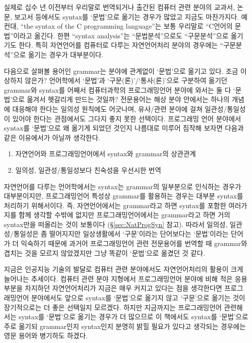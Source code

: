 실제로 십수 년 이전부터 우리말로 번역되거나 출간된 컴퓨터 관련 분야의
교과서, 논문, 보고서 등에서도 syntax를 `문법'으로 옮기는 경우가 많았고
지금도 마찬가지다. 예컨대, ``the syntax of the C programming language''는
보통 우리말로 ``C언어의 문법''이라고 옮긴다. 한편 ``syntax analysis''는
``문법분석''으로도 ``구문분석''으로 옮기기도 한다. 특히 자연언어를 컴퓨터로
다루는 자연언어처리 분야의 경우에는 ``구문분석''으로 옮기는 경우가 대부분이다.

다음으로 살펴볼 용어인 grammar는 분야에 관계없이 `문법'으로 옮기고 있다.
조금 이상하지 않은가? 언어학에서 `문법'과 `구문(론)'/`통사(론)'으로 구분하여
옮기던 grammar와 syntax를 어째서 컴퓨터과학의 프로그래밍언어 분야에 와서는
둘 다 `문법'으로 옮겨서 헷갈리게 만드는 것일까? 전문용어는 해상 분야 안에서는
하나의 개념에 대응해야 한다는 일의성 원칙에도 어긋나며, 유사/관련 분야에 걸쳐
일관성/통일성이 있어야 한다는 관점에서도 그다지 좋지 못한 선택이다.
프로그래밍 언어 분야에서 syntax를 `문법'으로 왜 옮기게 되었던 것인지
나름대로 미루어 짐작해 보자면 다음과 같은 이유에서가 아닐까 생각한다.
\begin{enumerate}\tightlist
    \item 자연언어와 프로그래밍언어에서 syntax와 grammar의 상관관계
    \item 일의성, 일관성/통일성보다 친숙성을 우선시한 번역
\end{enumerate}

자연언어를 다루는 언어학에서는 syntax는 grammar의 일부분으로 인식하는 경우가
대부분이지만, 프로그래밍언어 특성상 grammar를 활용하는 경우는 대부분
syntax를 처리하기 위해서이다. 즉, 자연언어에서는 grammar라고 하면 syntax를
포함한 여러가지를 함께 생각할 수밖에 없지만 프로그래밍언어에서는 grammar라고
하면 거의 syntax만을 떠올리는 것이 보통이다 (\S\ref{sec:NatProgSyn} 참고).
따라서 일의성, 일관성/통일성은 좀 떨어지지만 일상생활에서 `구문'이라는
단어보다는 `문법'이라는 단어가 더 익숙하기 때문에 과거어 프로그래밍언어 관련
전문용어를 번역할 때 grammar와 겹치는 것을 모르지 않았겠지만 그냥 똑같이
`문법'으로 옮겼던 것 같다.

지금은 인공지능 기술의 발달로 컴퓨터 관련 분야에서도 자연언어처리의 활용이
크게 늘어나는 추세이다. 컴퓨터 관련 분야 지형에서 프로그래밍언어 분야에 비해
적은 응용 부분을 차지하던 자연언어처리가 지금은 매우 커지고 있다는 점을
생각한다면 프로그래밍언어 분야에서도 앞으로 syntax를 `문법'으로 옮기지 않고
`구문'으로 옮기는 것이 장기적으로는 더 좋은 선택일지 모르겠다. 하지만
지금까지는 프로그래밍언어 관련해서는 syntax를 `문법'으로 옮기는 경우가 더
많으므로 이 책에서도 syntax를 `문법'으로 주로 옮기되 grammar인지 syntax인지
분명히 밝힐 필요가 있다고 생각되는 경우에는 영문 용어와 병기하도 하겠다.

